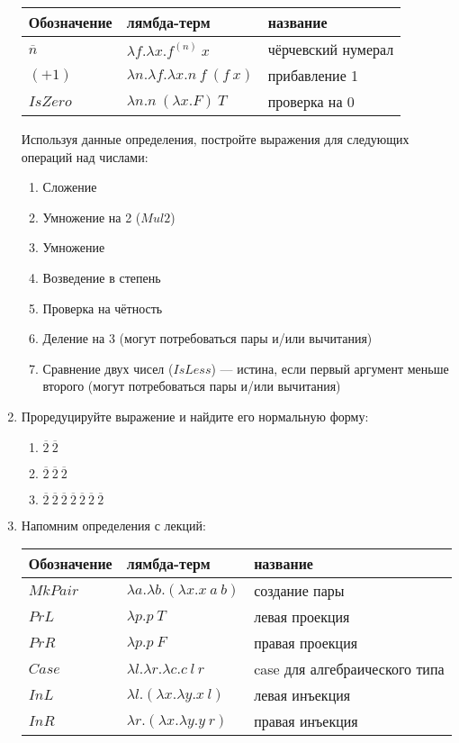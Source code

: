 \documentclass[10pt,a4paper,oneside]{article}
\begin{document}
\begin{enumerate}
\begin{center}\begin{tabular}{lll}
Обозначение & лямбда-терм & название\\\hline
$\overline{n}$ & $\lambda f.\lambda x.f^{(n)}\ x$ & чёрчевский нумерал\\
$(+1)$ & $\lambda n.\lambda f.\lambda x.n\ f\ (f\ x)$ & прибавление 1\\
$IsZero$ & $\lambda n.n\ (\lambda x.F)\ T$ & проверка на 0
\end{tabular}\end{center}

Используя данные определения, постройте выражения для следующих операций над числами:

\begin{enumerate}
\item Сложение
\item Умножение на 2 ($Mul2$)
\item Умножение
\item Возведение в степень
\item Проверка на чётность
\item Деление на 3 (могут потребоваться пары и/или вычитания)
\item Сравнение двух чисел ($IsLess$) — истина, если первый аргумент меньше второго
(могут потребоваться пары и/или вычитания)
\end{enumerate}

\item Проредуцируйте выражение и найдите его нормальную форму: 
\begin{enumerate}
\item $\overline{2}\ \overline{2}$
\item $\overline{2}\ \overline{2}\ \overline{2}$
\item $\overline{2}\ \overline{2}\ \overline{2}\ \overline{2}\ \overline{2}\ \overline{2}\ \overline{2}$
\end{enumerate}

\item Напомним определения с лекций:

\begin{tabular}{lll}
Обозначение & лямбда-терм & название\\\hline
$MkPair$ & $\lambda a.\lambda b.(\lambda x.x\ a\ b)$ & создание пары\\
$PrL$ & $\lambda p.p\ T$ & левая проекция\\
$PrR$ & $\lambda p.p\ F$ & правая проекция\\\hline
$Case$ & $\lambda l.\lambda r.\lambda c.c\ l\ r$ & case для алгебраического типа\\
$InL$ & $\lambda l.(\lambda x.\lambda y.x\ l)$ & левая инъекция\\
$InR$ & $\lambda r.(\lambda x.\lambda y.y\ r)$ & правая инъекция\\
\end{tabular}


\end{enumerate}
\end{document}
